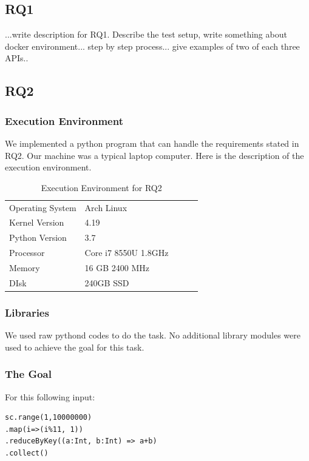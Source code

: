 \documentclass[sigplan]{acmart}\settopmatter{printfolios=true,printccs=false,printacmref=false}
\begin{document}
\subsection{RQ1}
...write description for RQ1. Describe the test setup, write something about docker environment... step by step process... give examples of two of each three APIs..

\subsection{RQ2}
\subsubsection{Execution Environment}
We implemented a python program that can handle the requirements stated in RQ2. Our machine was a typical laptop computer. Here is the description of the execution environment.

\begin{table}[]
\begin{tabular}{|l|l|lll}
\cline{1-2}
Operating System & Arch Linux           &  &  &  \\ \cline{1-2}
Kernel Version   & 4.19                 &  &  &  \\ \cline{1-2}
Python Version   & 3.7                  &  &  &  \\ \cline{1-2}
Processor        & Core i7 8550U 1.8GHz &  &  &  \\ \cline{1-2}
Memory           & 16 GB 2400 MHz       &  &  &  \\ \cline{1-2}
DIsk             & 240GB SSD            &  &  &  \\ \cline{1-2}
\end{tabular}
\caption{Execution Environment for RQ2}
\label{tab:env}
\end{table}

\subsubsection{Libraries}
We used raw pythond codes to do the task. No additional library modules were used to achieve the goal for this task.

\subsubsection{The Goal}
For this following input:
\begin{lstlisting}
sc.range(1,10000000)
.map(i=>(i%11, 1))
.reduceByKey((a:Int, b:Int) => a+b)
.collect()
\end{lstlisting}
\end{document}
